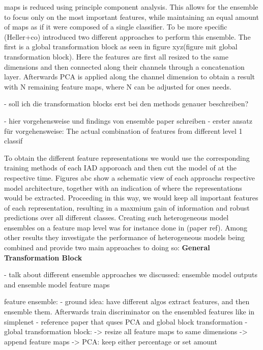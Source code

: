 maps is reduced using principle component analysis. This allows for the ensemble to focus only on the most important features, while maintaining 
an equal amount of maps as if it were composed of a single classifier. To be more specific (Heller+co) \cite{EnsembleHeller2023} introduced two different 
approaches to perform this ensemble. The first is a global transformation block as seen in figure xyz(figure mit global transformation block). 
Here the features are first all resized to the same dimensions and then connected along their channels through a concatenation layer.
Afterwards PCA is applied along the channel dimension to obtain a result with N remaining feature maps, where N can be adjusted for ones 
needs.



- soll ich die transformation blocks erst bei den methods genauer beschreiben?

- hier vorgehensweise und findings von ensemble paper schreiben
- erster ansatz für vorgehensweise:
The actual combination of features from different level 1 classif


To obtain the different feature representations 
we would use the corresponding training methods of each IAD apporoach and then cut the model of at the respective time. Figures abc show a schematic view of each approachs respective model 
architecture, together with an indication of where the representations would be extracted. Proceeding in this way, we would keep all important features of each representation, resulting in a 
maxmium gain of information and robust predictions over all different classes.
Creating such heterogeneous model ensembles on a feature map level was for instance done in (paper ref). Among other results they investigate the performance of heterogeneous models being 
combined and provide two main approaches to doing so:
\textbf{General Transformation Block}




- talk about different ensemble approaches we discussed: ensemble model outputs and ensemble model feature maps

feature ensemble:
- ground idea: have different algos extract features, and then ensemble them. Afterwards train discriminator on the ensembled features like in simplenet
- reference paper that quses PCA and global block transformation
- global transformation block:
-> resize all feature maps to same dimensions
-> append feature maps
-> PCA: keep either percentage or set amount

